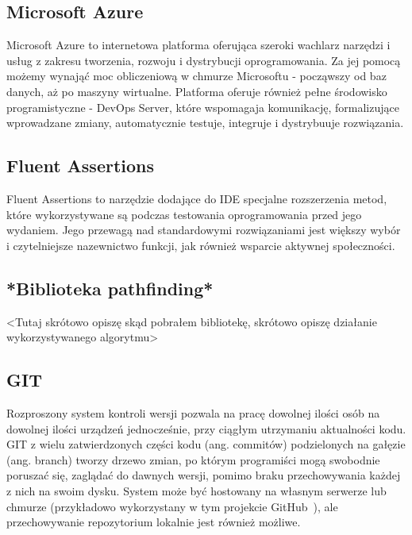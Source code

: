 \subsection{Microsoft Azure}
Microsoft Azure \cite{azure} to internetowa platforma oferująca szeroki wachlarz narzędzi i usług
z zakresu tworzenia, rozwoju i dystrybucji oprogramowania. Za jej pomocą możemy wynająć moc obliczeniową
w chmurze Microsoftu - począwszy od baz danych, aż po maszyny wirtualne. Platforma oferuje również
pełne środowisko programistyczne - DevOps Server, które wspomagaja komunikację, 
formalizujące wprowadzane zmiany, automatycznie testuje, integruje i dystrybuuje rozwiązania.

\subsection{Fluent Assertions}
Fluent Assertions \cite{fluentassertions} to narzędzie dodające do IDE specjalne rozszerzenia
metod, które wykorzystywane są podczas testowania oprogramowania przed jego wydaniem.
Jego przewagą nad standardowymi rozwiązaniami jest większy wybór i czytelniejsze
nazewnictwo funkcji, jak również wsparcie aktywnej społeczności.


\subsection{*Biblioteka pathfinding*}
<Tutaj skrótowo opiszę skąd pobrałem bibliotekę, skrótowo opiszę działanie wykorzystywanego algorytmu>

\subsection{GIT}
Rozproszony system kontroli wersji pozwala na pracę dowolnej ilości osób na dowolnej ilości urządzeń jednocześnie, 
przy ciągłym utrzymaniu aktualności kodu.
GIT z wielu zatwierdzonych części kodu (ang. commitów) podzielonych na gałęzie (ang. branch) tworzy drzewo zmian, 
po którym programiści mogą swobodnie 
poruszać się, zaglądać do dawnych wersji, pomimo braku przechowywania każdej z nich na swoim dysku.
System może być hostowany na własnym serwerze lub chmurze (przykładowo wykorzystany w tym projekcie 
GitHub~\cite{github,Halaczkiewicz_SMCEBI_Navigator_GitHub}), 
ale przechowywanie repozytorium lokalnie jest również możliwe.
